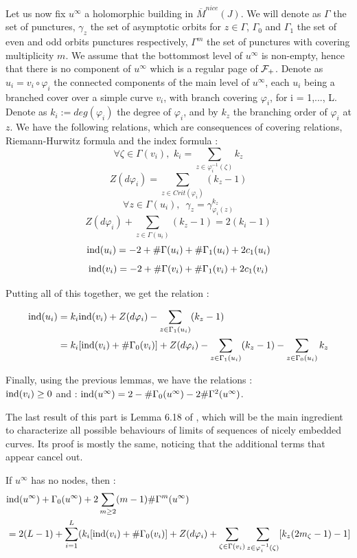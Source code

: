 \documentclass[../main.tex]{subfiles}
\begin{document}
Let us now fix $u^\infty$ a holomorphic building in $\overline{M}^{nice}(J)$. We will denote as $\Gamma$ the set of punctures, $\gamma_z$ the set of asymptotic orbits for $z\in\Gamma$, $\Gamma_0$ and $\Gamma_1$ the set of even and odd orbits punctures respectively, $\Gamma^m$ the set of punctures with covering multiplicity $m$. We assume that the bottommost level of $u^\infty$ is non-empty, hence that there is no component of $u^\infty$ which is a regular page of $\mathcal{F}_+$. Denote as $u_i = v_i\circ \varphi_i$ the connected components of the main level of $u^\infty$, each $u_i$ being a branched cover over a simple curve $v_i$, with branch covering $\varphi_i$, for i = 1,..., L. Denote as $k_i := deg(\varphi_i)$ the degree of $\varphi_i$, and by $k_z$ the branching order of $\varphi_i$ at $z$. We have the following relations, which are consequences of covering relations, Riemann-Hurwitz formula and the index formula : 
$$\forall \zeta\in \Gamma(v_i),\,\,k_i = \sum_{z\in\varphi_i^{-1}(\zeta)}{k_z}$$
$$Z(d\varphi_i) = \sum_{z\in Crit(\varphi_i)}{(k_z - 1)}$$
$$\forall z\in\Gamma(u_i), \,\,\,\gamma_z = \gamma_{\varphi_i(z)}^{k_z}$$
$$Z(d\varphi_i) + \sum_{z\in\Gamma(u_i)}(k_z-1) = 2(k_i - 1)$$
$$\text{ind}(u_i) = -2 + \#\Gamma(u_i) + \#\Gamma_1(u_i) + 2c_1(u_i)$$
$$\text{ind}(v_i) = -2  + \#\Gamma(v_i) + \#\Gamma_1(v_i) + 2c_1(v_i)$$

Putting all of this together, we get the relation :

\begin{align*}
    \text{ind}(u_i) &= k_i \text{ind}(v_i) + Z(d\varphi_i) - \sum_{z\in\Gamma_1(u_i)}(k_z -1)\\
    &= k_i[\text{ind}(v_i)+\#\Gamma_0(v_i)] + Z(d\varphi_i) - \sum_{z\in\Gamma_1(u_i)}(k_z - 1) - \sum_{z\in\Gamma_0(u_i)}k_z
\end{align*}



Finally, using the previous lemmas, we have the relations :\\
$\text{ind}(v_i)\geq 0$ and : $\text{ind}(u^\infty) = 2 - \#\Gamma_0(u^\infty) - 2\#\Gamma^2(u^\infty)$. 


The last result of this part is Lemma 6.18 of \cite{SOBD2}, which will be the main ingredient to characterize all possible behaviours of limits of sequences of nicely embedded curves. Its proof is mostly the same, noticing that the additional terms that appear cancel out.


\begin{lemma}
If $u^\infty$ has no nodes, then :
\begin{align*}
&\text{ind}(u^\infty) + \Gamma_0(u^\infty) + 2\sum_{m\geq 2}(m-1)\#\Gamma^m(u^\infty) \\ &= 2(L-1) + \sum_{i = 1}^L(k_i[\text{ind}(v_i) + \#\Gamma_0(v_i)] + Z(d\varphi_i) + \sum_{\zeta\in\Gamma(v_i)}\sum_{z\in\varphi_i^{-1}(\zeta)}[k_z(2m_\zeta - 1)-1]
\end{align*}
\end{lemma}
\end{document}
